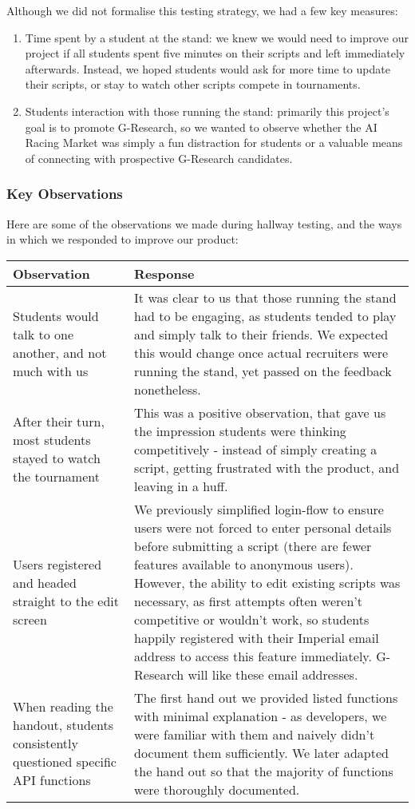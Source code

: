 Although we did not formalise this testing strategy, we had a few key measures:
\vspace*{-6mm}
\begin{enumerate} \itemsep -1pt 
\item Time spent by a student at the stand: we knew we would need to improve our project if all students spent five minutes on their scripts and left immediately afterwards. Instead, we hoped students would ask for more time to update their scripts, or stay to watch other scripts compete in tournaments. 
\item Students interaction with those running the stand: primarily this project's goal is to promote G-Research, so we wanted to observe whether the AI Racing Market was simply a fun distraction for students or a valuable means of connecting with prospective G-Research candidates. 
\end{enumerate}

\subsubsection{Key Observations}

Here are some of the observations we made during hallway testing, and the ways in which we responded to improve our product: \\

\begin{tabularx}{\textwidth}{ | X | p{} |}
\hline
Observation & Response \\
\hline\hline
Students would talk to one another, and not much with us 
	& It was clear to us that those running the stand had to be engaging, as students tended to play and simply talk to their friends. We expected this would change once actual recruiters were running the stand, yet passed on the feedback nonetheless. \\ \hline
After their turn, most students stayed to watch the tournament
	& This was a positive observation, that gave us the impression students were thinking competitively - instead of simply creating a script, getting frustrated with the product, and leaving in a huff. \\ \hline 
Users registered and headed straight to the edit screen 
	& We previously simplified login-flow to ensure users were not forced to enter personal details before submitting a script (there are fewer features available to anonymous users). However, the ability to edit existing scripts was necessary, as first attempts often weren't competitive or wouldn't work, so students happily registered with their Imperial email address to access this feature immediately. G-Research will like these email addresses. \\ \hline 
When reading the handout, students consistently questioned specific API functions
	& The first hand out we provided listed functions with minimal explanation - as developers, we were familiar with them and naively didn't document them sufficiently. We later adapted the hand out so that the majority of functions were thoroughly documented. \\ 
\hline
\end{tabularx}

